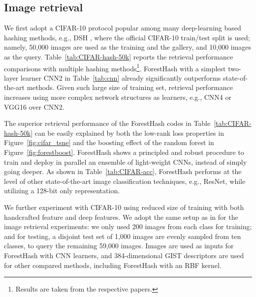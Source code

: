 \documentclass[runningheads]{llncs}
\begin{document}
\subsection{Image retrieval}
We first adopt a CIFAR-10 protocol popular among many deep-learning based
hashing methods, e.g., DSH \cite{DSH}, where the official CIFAR-10 train/test
split is used; namely, 50,000 images are used as the training and the gallery,
and 10,000 images as the query.  Table~\ref{tab:CIFAR-hash-50k} reports the
retrieval performance comparisons with multiple hashing methods\footnote{Results
  are taken from the respective papers.}. ForestHash with a simplest two-layer
learner {CNN2} in Table~\ref{tab:cnn} already significantly outperforms
state-of-the-art methods. Given such large size of training set, retrieval
performance increases using more complex network structures as learners, e.g.,
{CNN4} or {VGG16} over {CNN2}.


The superior retrieval performance of the ForestHash codes in
Table~\ref{tab:CIFAR-hash-50k} can be easily explained by both the low-rank loss
properties in Figure~\ref{fig:cifar_tsne} and the boosting effect of the random
forest in Figure~\ref{fig:forestboost}.  ForestHash shows a principled and
robust procedure to train and deploy in parallel an ensemble of light-weight
CNNs, instead of simply going deeper.  As shown in Table~\ref{tab:CIFAR-acc},
ForestHash performs at the level of other state-of-the-art image classification
techniques, e.g., ResNet, while utilizing a 128-bit only representation.


We further experiment with CIFAR-10 using reduced size of training with both handcrafted feature and deep features.  We adopt
the same setup as in \cite{KSH, sparsehash} for the image retrieval experiments:
we only used 200 images from each class for training; and for testing, a
disjoint test set of 1,000 images are evenly sampled from ten classes, to query
the remaining 59,000 images.  Images are used as inputs for ForestHash with CNN
learners, and 384-dimensional GIST descriptors are used for other compared
methods, including ForestHash with an RBF kernel.
\end{document}
